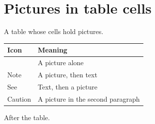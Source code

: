 \documentclass[11pt,a4paper]{article}
\begin{document}
\section{Pictures in table cells}

A table whose cells hold pictures.

\begin{table}[h]
\begin{tabular}{|l|l|}
\hline
Icon & Meaning \\ \hline
 & A picture alone \\ \hline
Note & A picture, then text \\ \hline
See & Text, then a picture \\ \hline
Caution  %
 & A picture in the second paragraph \\ \hline
\end{tabular}
\end{table}

After the table.

\begin{figure}[h]
\end{figure}
\end{document}
